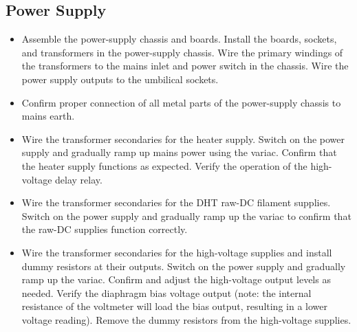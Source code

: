 \subsection{Power Supply}
\begin{itemize}
\item Assemble the power-supply chassis and boards. Install the boards, sockets, and transformers in the power-supply chassis. Wire the primary windings of the transformers to the mains inlet and power switch in the chassis. Wire the power supply outputs to the umbilical sockets.
\item Confirm proper connection of all metal parts of the power-supply chassis to mains earth.
\item Wire the transformer secondaries for the heater supply. Switch on the power supply and gradually ramp up mains power using the variac. Confirm that the heater supply functions as expected. Verify the operation of the high-voltage delay relay.
\item Wire the transformer secondaries for the DHT raw-DC filament supplies. Switch on the power supply and gradually ramp up the variac to confirm that the raw-DC supplies function correctly.
\item Wire the transformer secondaries for the high-voltage supplies and install dummy resistors at their outputs. Switch on the power supply and gradually ramp up the variac. Confirm and adjust the high-voltage output levels as needed. Verify the diaphragm bias voltage output (note: the internal resistance of the voltmeter will load the bias output, resulting in a lower voltage reading). Remove the dummy resistors from the high-voltage supplies.
\end{itemize}

